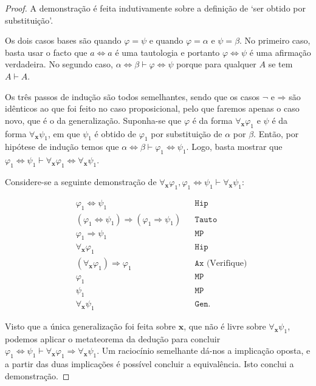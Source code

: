\documentclass{report}
\theoremstyle{definition}
\theoremstyle{remark}
\renewcommand{\bf}[1]{\mathbf{#1}}
\newcommand{\imply}{\mathbin{\Rightarrow}}
\newcommand{\eqv}{\mathbin{\Leftrightarrow}}
\begin{document}
	\begin{proof}
	A demonstração é feita indutivamente sobre a definição de `ser obtido por substituição'.

	Os dois casos bases são quando $\varphi = \psi$ e quando $\varphi = \alpha$ e $\psi = \beta$. No primeiro caso, basta usar o facto que $a \eqv a$ é uma tautologia e portanto $\varphi \eqv \psi$ é uma afirmação verdadeira. No segundo caso, $\alpha \eqv \beta \vdash \varphi \eqv \psi$ porque para qualquer $A$ se tem $A \vdash A$.

	Os três passos de indução são todos semelhantes, sendo que os casos $\neg$ e $\imply$ são idênticos ao que foi feito no caso proposicional, pelo que faremos apenas o caso novo, que é o da generalização. Suponha-se que $\varphi$ é da forma $\forall_{\bf x} \varphi_1$ e $\psi$ é da forma $\forall_{\bf x} \psi_1$, em que $\psi_1$ é obtido de $\varphi_1$ por substituição de $\alpha$ por $\beta$. Então, por hipótese de indução temos que $\alpha \eqv \beta \vdash \varphi_1 \eqv \psi_1$. Logo, basta mostrar que $\varphi_1 \eqv \psi_1 \vdash \forall_{\bf x} \varphi_1 \eqv \forall_{\bf x} \psi_1$.

	Considere-se a seguinte demonstração de $\forall_{\bf x} \varphi_1, \varphi_1 \eqv \psi_1 \vdash \forall_{\bf x} \psi_1$:

\begin{align*}
&\varphi_1 \eqv \psi_1&&\mathtt{Hip}\\
&(\varphi_1 \eqv \psi_1 ) \imply (\varphi_1 \imply \psi_1)&&\mathtt{Tauto}\\
&\varphi_1 \imply \psi_1&&\mathtt{MP}\\
&\forall_{\bf x} \varphi_1&&\mathtt{Hip}\\
&(\forall_{\bf x} \varphi_1) \imply \varphi_1&&\mathtt{Ax}\text{ (Verifique)}\\
&\varphi_1&&\mathtt{MP}\\
&\psi_1&&\mathtt{MP}\\
&\forall_{\bf x} \psi_1&&\mathtt{Gen}.
\end{align*}

	Visto que a única generalização foi feita sobre $\bf x$, que não é livre sobre $\forall_{\bf x} \psi_1$, podemos aplicar o metateorema da dedução para concluir $\varphi_1 \eqv \psi_1 \vdash \forall_{\bf x} \varphi_1 \imply \forall_{\bf x} \psi_1$. Um raciocínio semelhante dá-nos a implicação oposta, e a partir das duas implicações é possível concluir a equivalência. Isto conclui a demonstração.
	\end{proof}
	
\end{document}
